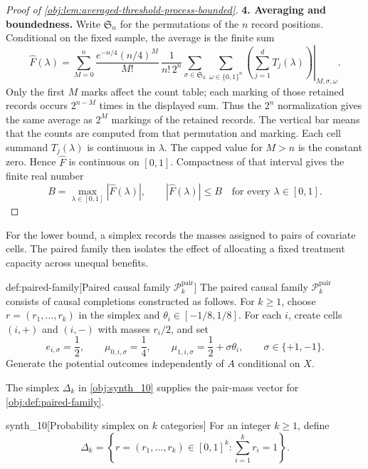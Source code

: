 \documentclass[11pt]{article}
\begin{document}
\begin{proof}[Proof of \cref{obj:lem:averaged-threshold-process-bounded}]
\noindent\textbf{4. Averaging and boundedness.}
Write \(\mathfrak S_n\) for the permutations of the \(n\) record positions. Conditional on the fixed sample, the average is the finite sum
\[
\widehat F(\lambda)
=
\sum_{M=0}^{n}
\frac{e^{-n/4}(n/4)^M}{M!}\,
\frac{1}{n!\,2^n}
\sum_{\sigma\in\mathfrak S_n}
\sum_{\omega\in\{0,1\}^n}
\left.\left(\sum_{j=1}^{d}T_j(\lambda)\right)
\right|_{M,\sigma,\omega}.
\]
Only the first \(M\) marks affect the count table; each marking of those retained records occurs \(2^{n-M}\) times in the displayed sum. Thus the \(2^n\) normalization gives the same average as \(2^M\) markings of the retained records. The vertical bar means that the counts are computed from that permutation and marking. Each cell summand \(T_j(\lambda)\) is continuous in \(\lambda\). The capped value for \(M>n\) is the constant zero. Hence \(\widehat F\) is continuous on \([0,1]\). Compactness of that interval gives the finite real number
\[
B=\max_{\lambda\in[0,1]}|\widehat F(\lambda)|,
\qquad
|\widehat F(\lambda)|\leq B
\quad\text{for every }\lambda\in[0,1].
\]
\end{proof}

For the lower bound, a simplex records the masses assigned to pairs of covariate cells. The paired family then isolates the effect of allocating a fixed treatment capacity across unequal benefits.

\begin{definitionv}{def:paired-family}[Paired causal family $\mathcal P_k^{\mathrm{pair}}$]
The paired causal family \(\mathcal P_k^{\mathrm{pair}}\) consists of causal completions constructed as follows. For \(k\geq1\), choose \(r=(r_1,\ldots,r_k)\) in the simplex and \(\theta_i\in[-1/8,1/8]\). For each \(i\), create cells \((i,+)\) and \((i,-)\) with masses \(r_i/2\), and set
\[
e_{i,\sigma}=\frac12,\qquad
\mu_{0,i,\sigma}=\frac14,\qquad
\mu_{1,i,\sigma}=\frac12+\sigma\theta_i,
\qquad
\sigma\in\{+1,-1\}.
\]
Generate the potential outcomes independently of \(A\) conditional on \(X\).
\end{definitionv}

The simplex \(\Delta_k\) in \cref{obj:synth_10} supplies the pair-mass vector for \cref{obj:def:paired-family}.

\begin{definitionv}{synth_10}[Probability simplex on \(k\) categories]
For an integer \(k\geq1\), define
\[
\Delta_k=\left\{r=(r_1,\ldots,r_k)\in[0,1]^k:\sum_{i=1}^k r_i=1\right\}.
\]
\end{definitionv}
\end{document}
